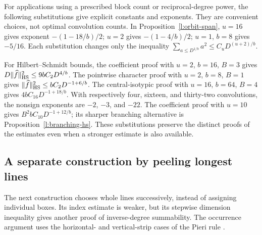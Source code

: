 For applications using a prescribed block count or reciprocal-degree power, the following substitutions give explicit constants and exponents. They are convenient choices, not optimal convolution counts. In Proposition~\ref{l:orbit-span}, $u=16$ gives exponent $-(1-18/b)/2$; $u=2$ gives $-(1-4/b)/2$; $u=1$, $b=8$ gives $-5/16$. Each substitution changes only the inequality $\sum_{a\le D^{1/b}}a^2\le C_uD^{(u+2)/b}$.

For Hilbert--Schmidt bounds, the coefficient proof with $u=2$, $b=16$, $B=3$ gives $D\|\widehat f\|_{\mathrm{HS}}^2\le9bC_2D^{4/b}$. The pointwise character proof with $u=2$, $b=8$, $B=1$ gives $\|\widehat f\|_{\mathrm{HS}}^2\le bC_2D^{-1+6/b}$. The central-isotypic proof with $u=16$, $b=64$, $B=4$ gives $4bC_{16}D^{-1+18/b}$. With respectively four, sixteen, and thirty-two convolutions, the nonsign exponents are $-2$, $-3$, and $-22$. The coefficient proof with $u=10$ gives $B^2bC_{10}D^{-1+12/b}$; its sharper branching alternative is Proposition~\ref{l:branching-hs}. These substitutions preserve the distinct proofs of the estimates even when a stronger estimate is also available.

\subsection{A separate construction by peeling longest lines}

The next construction chooses whole lines successively, instead of
assigning individual boxes.  Its index estimate is weaker, but its
stepwise dimension inequality gives another proof of inverse-degree
summability.  The occurrence argument uses the horizontal- and
vertical-strip cases of the Pieri rule \cite{sagan}.

